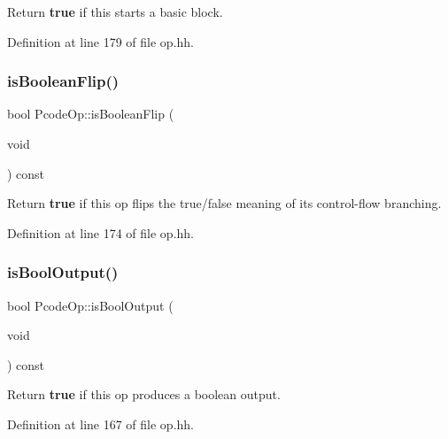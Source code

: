 Return {\bfseries{true}} if this starts a basic block. 



Definition at line 179 of file op.\+hh.

\mbox{\label{class_pcode_op_a372abd9553271da8620c4b9597f4e2aa}} 
\subsubsection{\texorpdfstring{isBooleanFlip()}{isBooleanFlip()}}
{\footnotesize\ttfamily bool Pcode\+Op\+::is\+Boolean\+Flip (\begin{DoxyParamCaption}\item[{void}]{ }\end{DoxyParamCaption}) const\hspace{0.3cm}{\ttfamily [inline]}}



Return {\bfseries{true}} if this op flips the true/false meaning of its control-\/flow branching. 



Definition at line 174 of file op.\+hh.

\mbox{\label{class_pcode_op_a1e5a11d0bb8774586de3b702418535ed}} 
\subsubsection{\texorpdfstring{isBoolOutput()}{isBoolOutput()}}
{\footnotesize\ttfamily bool Pcode\+Op\+::is\+Bool\+Output (\begin{DoxyParamCaption}\item[{void}]{ }\end{DoxyParamCaption}) const\hspace{0.3cm}{\ttfamily [inline]}}



Return {\bfseries{true}} if this op produces a boolean output. 



Definition at line 167 of file op.\+hh.

\mbox{\label{class_pcode_op_ab1a080620a1029e3970c5745be7ec075}} 
